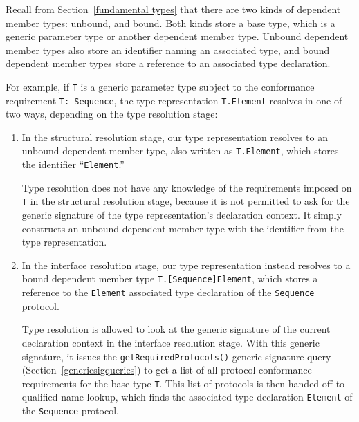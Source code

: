 \documentclass[../generics]{subfiles}
\begin{document}
Recall from Section~\ref{fundamental types} that there are two kinds of dependent member types: unbound, and bound. Both kinds store a base type, which is a generic parameter type or another dependent member type. Unbound dependent member types also store an identifier naming an associated type, and bound dependent member types store a reference to an associated type declaration.

For example, if \texttt{T} is a generic parameter type subject to the conformance requirement \verb|T: Sequence|, the type representation \texttt{T.Element} resolves in one of two ways, depending on the type resolution stage:
\begin{enumerate}
\item In the structural resolution stage, our type representation resolves to an unbound dependent member type, also written as \texttt{T.Element}, which stores the identifier ``\texttt{Element}.''

Type resolution does not have any knowledge of the requirements imposed on \texttt{T} in the structural resolution stage, because it is not permitted to ask for the generic signature of the type representation's declaration context. It simply constructs an unbound dependent member type with the identifier from the type representation.
\item In the interface resolution stage, our type representation instead resolves to a bound dependent member type \texttt{T.[Sequence]Element}, which stores a reference to the \texttt{Element} associated type declaration of the \texttt{Sequence} protocol.

Type resolution is allowed to look at the generic signature of the current declaration context in the interface resolution stage. With this generic signature, it issues the \verb|getRequiredProtocols()| generic signature query (Section~\ref{genericsigqueries}) to get a list of all protocol conformance requirements for the base type \texttt{T}. This list of protocols is then handed off to qualified name lookup, which finds the associated type declaration \texttt{Element} of the \texttt{Sequence} protocol.
\end{enumerate}
\end{document}
